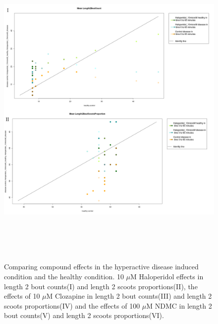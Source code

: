 \documentclass[a4paper,12pt]{article}
\begin{document}
\newpage
\begin{figure}[h!]
\begin{center}
\caption{Comparing compound effects in the hyperactive disease induced condition and the healthy condition. 10 $\mu$M Haloperidol effects in length 2 bout counts(I) and length 2 scoots proportions(II), the effects of 10 $\mu$M Clozapine in length 2 bout counts(III) and length 2 scoots proportions(IV) and the effects of 100 $\mu$M NDMC in length 2 bout counts(V) and length 2 scoots proportions(VI).}
\includegraphics[width=15cm,height=16cm]{ApoHighCountScootsH.png}
\end{center}
\end{figure}
\newpage
\end{document}

